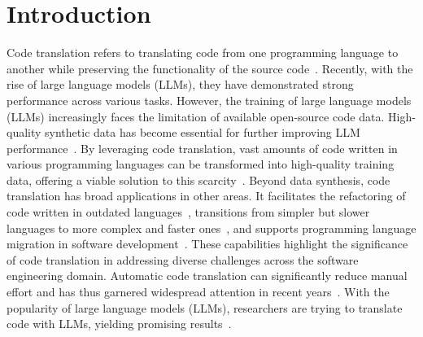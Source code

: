 \section{Introduction}
Code translation refers to translating code from one programming language to another while preserving the functionality of the source code~\cite{pan2024lost,sun2024survey,eniser2024towards,dou2024s}. 
Recently, with the rise of large language models (LLMs), they have demonstrated strong performance across various tasks.
However, the training of large language models (LLMs) increasingly faces the limitation of available open-source code data. High-quality synthetic data has become essential for further improving LLM performance~\cite{austin2021program,nijkamp2022codegen}. By leveraging code translation, vast amounts of code written in various programming languages can be transformed into high-quality training data, offering a viable solution to this scarcity~\cite{xie2023data,ren2020codebleu,hendrycks2021measuringcodingchallengecompetence}.
Beyond data synthesis, code translation has broad applications in other areas. It facilitates the refactoring of code written in outdated languages~\cite{aggarwal2015using}, transitions from simpler but slower languages to more complex and faster ones~\cite{szafraniec2022code}, and supports programming language migration in software development~\cite{nguyen2013lexical,nguyen2014migrating,mossienko2003automated,hassan2005lightweight,bartolomei2010swing,zhong2010mining,nguyen2014statistical,gu2017deepam}. These capabilities highlight the significance of code translation in addressing diverse challenges across the software engineering domain.
Automatic code translation can significantly reduce manual effort and has thus garnered widespread attention in recent years~\cite{bahdanau2014neural, chen2018tree, artetxe2018unsupervised, devlin2018bert, feng2020codebert, guo2020graphcodebert, ahmad2021unified, guo2022unixcoder, zheng2023codegeex}. With the popularity of large language models (LLMs), researchers are trying to translate code with LLMs, yielding promising results~\cite {yang2024UniTrans,lano2024using,nitin2024spectra}. 


